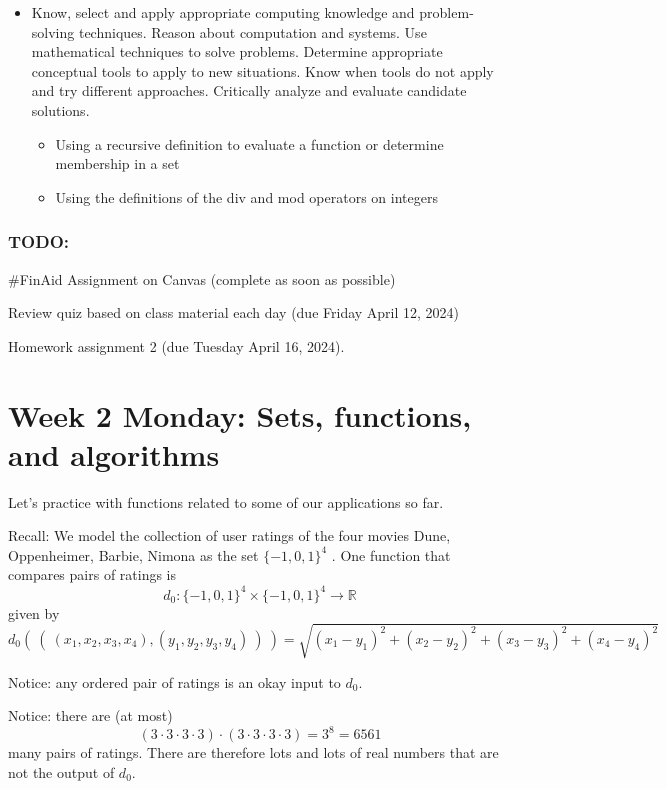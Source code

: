 \documentclass[12pt, oneside]{article}
\begin{document}
\begin{itemize}
\item Know, select and apply appropriate computing knowledge and problem-solving techniques. Reason about computation and systems. Use mathematical techniques to solve problems. Determine appropriate conceptual tools to apply to new situations. Know when tools do not apply and try different approaches. Critically analyze and evaluate candidate solutions.
\begin{itemize}
    \item Using a recursive definition to evaluate a function or determine membership in a set
    \item Using the definitions of the div and mod operators on integers
\end{itemize}

\end{itemize}

\subsubsection*{TODO:}
\begin{list}
   {\itemsep2pt}
   \item \#FinAid Assignment on Canvas (complete as soon as possible) 
   \item Review quiz based on class material each day (due Friday April 12, 2024)
   \item Homework assignment 2 (due Tuesday April 16, 2024).
\end{list}

\newpage

\section*{Week 2 Monday: Sets, functions, and algorithms}


Let's practice with functions related to some of our applications so far.

Recall: We model the collection of user ratings of the four movies Dune, Oppenheimer, Barbie, Nimona as the set
$\{-1,0,1\}^4$ . One function that compares pairs of ratings is
$$d_0: \{-1,0,1\}^4 \times \{-1,0,1\}^4 \to \mathbb{R}$$
given by
\[
d_0 (~(~ (x_1, x_2, x_3, x_4), (y_1, y_2, y_3, y_4) ~) ~) = \sqrt{ (x_1 - y_1)^2 + (x_2 - y_2)^2 + (x_3 -y_3)^2 + (x_4 -y_4)^2}
\]

Notice: any ordered pair of ratings is an okay input to $d_0$.

Notice: there are (at most) 
\[
(3 \cdot 3 \cdot 3 \cdot 3)\cdot (3 \cdot 3 \cdot 3 \cdot 3) = 3^8 = 6561
\]
many pairs of ratings. There are therefore lots and lots of real numbers that are not the output of $d_0$.
\end{document}
